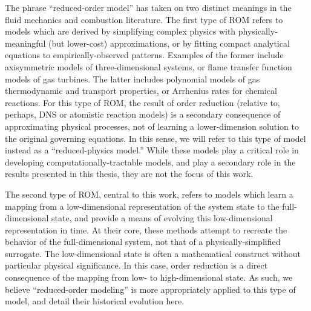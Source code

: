 The phrase ``reduced-order model'' has taken on two distinct meanings in the fluid mechanics and combustion literature. The first type of ROM refers to models which are derived by simplifying complex physics with physically-meaningful (but lower-cost) approximations, or by fitting compact analytical equations to empirically-observed patterns. Examples of the former include axisymmetric models of three-dimensional systems, or flame transfer function models of gas turbines. The latter includes polynomial models of gas thermodynamic and transport properties, or Arrhenius rates for chemical reactions. For this type of ROM, the result of order reduction (relative to, perhaps, DNS or atomistic reaction models) is a secondary consequence of approximating physical processes, not of learning a lower-dimension solution to the original governing equations. In this sense, we will refer to this type of model instead as a ``reduced-physics model.'' While these models play a critical role in developing computationally-tractable models, and play a secondary role in the results presented in this thesis, they are not the focus of this work.

The second type of ROM, central to this work, refers to models which learn a mapping from a low-dimensional representation of the system state to the full-dimensional state, and provide a means of evolving this low-dimensional representation in time. At their core, these methods attempt to recreate the behavior of the full-dimensional system, not that of a physically-simplified surrogate. The low-dimensional state is often a mathematical construct without particular physical significance. In this case, order reduction is a direct consequence of the mapping from low- to high-dimensional state. As such, we believe ``reduced-order modeling'' is more appropriately applied to this type of model, and detail their historical evolution here.



